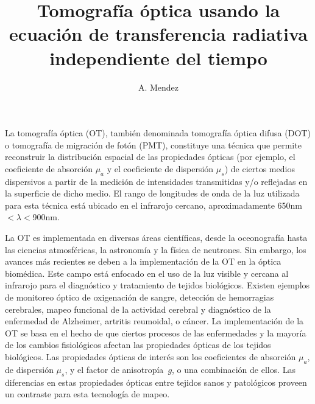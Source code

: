 \documentclass[a4paper,10pt]{article}
\title{Tomografía óptica usando la ecuación de transferencia radiativa 
independiente del tiempo}
\author{A. Mendez}
\date{}
\begin{document}
\maketitle


La tomografía óptica (OT), también denominada tomografía óptica difusa 
(DOT) o tomografía de migración de fotón (PMT), constituye una técnica
que permite reconstruir la distribución espacial de las propiedades
ópticas (por ejemplo, el coeficiente de absorción $\mu_a$ y el coeficiente 
de dispersión $\mu_s$) de ciertos medios dispersivos a partir de la 
medición de intensidades transmitidas y/o reflejadas en la superficie de
dicho medio. El rango de longitudes de onda de la luz utilizada para 
esta técnica está ubicado en el infrarojo cercano, aproximadamente
650nm$<\lambda<$900nm. 

La OT es implementada en diversas áreas científicas, desde la oceonografía 
hasta las ciencias atmosféricas, la astronomía y la física de neutrones. 
Sin embargo, los avances más recientes se deben a la implementación de la
OT en la óptica biomédica. Este campo está enfocado en el 
uso de la luz visible y cercana al infrarojo para el diagnóstico y 
tratamiento de tejidos biológicos. Existen ejemplos de monitoreo óptico 
de oxigenación de sangre, detección de hemorragias cerebrales, mapeo 
funcional de la actividad cerebral y diagnóstico de la enfermedad de 
Alzheimer, artritis reumoidal, o cáncer. La implementación de la OT se 
basa en el hecho de que ciertos procesos de las enfermedades y la mayoría 
de los cambios fisiológicos afectan las propiedades ópticas de los tejidos
biológicos. Las propiedades ópticas de interés son los coeficientes de 
absorción $\mu_a$, de dispersión $\mu_s$, y el factor de anisotropía~$g$, 
o una combinación de ellos. Las diferencias en estas propiedades ópticas 
entre tejidos sanos y patológicos proveen un contraste para esta 
tecnología de mapeo.
\end{document}
